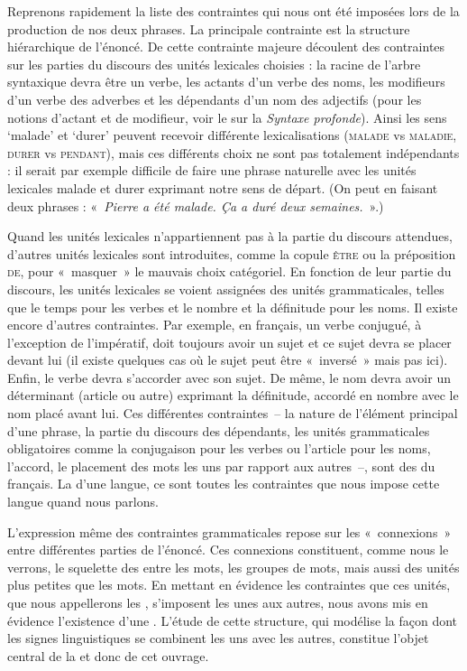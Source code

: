 Reprenons rapidement la liste des contraintes qui nous ont été imposées lors de la production de nos deux phrases. La principale contrainte est la structure hiérarchique de l’énoncé. De cette contrainte majeure découlent des contraintes sur les parties du discours des unités lexicales choisies : la racine de l’arbre syntaxique devra être un verbe, les actants d’un verbe des noms, les modifieurs d’un verbe des adverbes et les dépendants d’un nom des adjectifs (pour les notions d’actant et de modifieur, voir le  sur la \textit{Syntaxe profonde}). Ainsi les sens ‘malade’ et ‘durer’ peuvent recevoir différente lexicalisations (\textsc{malade} vs \textsc{maladie}, \textsc{durer} vs \textsc{pendant}), mais ces différents choix ne sont pas totalement indépendants : il serait par exemple difficile de faire une phrase naturelle avec les unités lexicales malade et durer exprimant notre sens de départ. (On peut en faisant deux phrases : «~\textit{Pierre a été malade. Ça a duré deux semaines.}~».)

Quand les unités lexicales n’appartiennent pas à la partie du discours attendues, d’autres unités lexicales sont introduites, comme la copule \textsc{être} ou la préposition \textsc{de}, pour «~masquer~» le mauvais choix catégoriel. En fonction de leur partie du discours, les unités lexicales se voient assignées des unités grammaticales, telles que le temps pour les verbes et le nombre et la définitude pour les noms. Il existe encore d’autres contraintes. Par exemple, en français, un verbe conjugué, à l’exception de l’impératif, doit toujours avoir un sujet et ce sujet devra se placer devant lui (il existe quelques cas où le sujet peut être «~inversé~» mais pas ici). Enfin, le verbe devra s’accorder avec son sujet. De même, le nom devra avoir un déterminant (article ou autre) exprimant la définitude, accordé en nombre avec le nom placé avant lui. Ces différentes contraintes~– la nature de l’élément principal d’une phrase, la partie du discours des dépendants, les unités grammaticales obligatoires comme la conjugaison pour les verbes ou l’article pour les noms, l’accord, le placement des mots les uns par rapport aux autres~–, sont des  du français. La  d’une langue, ce sont toutes les contraintes que nous impose cette langue quand nous parlons.

L’expression même des contraintes grammaticales repose sur les «~connexions~» entre différentes parties de l’énoncé. Ces connexions constituent, comme nous le verrons, le squelette des  entre les mots, les groupes de mots, mais aussi des unités plus petites que les mots. En mettant en évidence les contraintes que ces unités, que nous appellerons les , s’imposent les unes aux autres, nous avons mis en évidence l’existence d’une . L’étude de cette structure, qui modélise la façon dont les signes linguistiques se combinent les uns avec les autres, constitue l’objet central de la  et donc de cet ouvrage.


